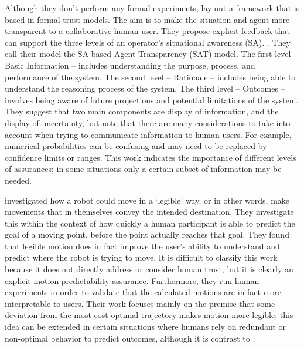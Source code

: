 Although they don't perform any formal experiments, \citet{Chen2014-dk} lay out a framework   that is based in formal trust models. The aim is to make the situation  and agent more transparent  to a collaborative human user. They propose explicit feedback that can support the three levels of an operator's situational awareness (SA). . They call their model the SA-based Agent Transparency (SAT) model. The first level -- Basic Information -- includes understanding the purpose, process, and performance of the system. The second level -- Rationale -- includes being able to understand the reasoning process of the system. The third level -- Outcomes -- involves being aware of future projections and potential limitations of the system. They suggest that two main components are display of information, and the display of uncertainty, but note that there are many considerations to take into account when trying to communicate information to human users. For example, numerical probabilities can be confusing and may need to be replaced by confidence limits or ranges. This work indicates the importance of different levels of assurances; in some situations only a certain subset of information may be needed. 

\citet{Dragan2013-wd} investigated how a robot could move in a `legible' way, or in other words, make movements that in themselves convey the intended destination.   They investigate this within the context of how quickly a human participant is able to predict the goal of a moving point, before the point actually reaches that goal. They found that legible motion does in fact improve the user's ability to understand and predict where the robot is trying to move. It is difficult to classify this work because it does not directly address or consider human trust, but it is clearly an explicit motion-predictability assurance. Furthermore, they run human experiments in order to validate that the calculated motions are in fact more interpretable to users. Their work focuses mainly on the premise that some deviation from the most cost optimal trajectory makes motion more legible, this idea can be extended in certain situations where humans rely on redundant or non-optimal behavior to predict outcomes, although it is contrast to \citet{Wu2016-ei}.

